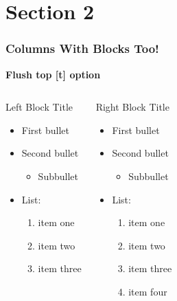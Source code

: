 \documentclass[aspectratio=1610]{beamer}
\begin{document}
\section{Section 2}
\begin{frame}[t]
  \frametitle{Columns With Blocks Too!}

  \textbf{Flush top [t] option}

  \begin{columns}[t]
    \begin{block}{Left Block Title}
    \begin{itemize}
    \item First bullet
    \item Second bullet
      \begin{itemize}
      \item Subbullet
      \end{itemize}
    \item List:
      \begin{enumerate}
      \item item one
      \item item two
      \item item three
      \end{enumerate}
    \end{itemize}
    \end{block}
    \begin{block}{Right Block Title}
    \begin{itemize}
    \item First bullet
    \item Second bullet
      \begin{itemize}
      \item Subbullet
      \end{itemize}
    \item List:
      \begin{enumerate}
      \item item one
      \item item two
      \item item three
      \item item four
      \end{enumerate}
    \end{itemize}
    \end{block}
  \end{columns}
\end{frame}
\end{document}
